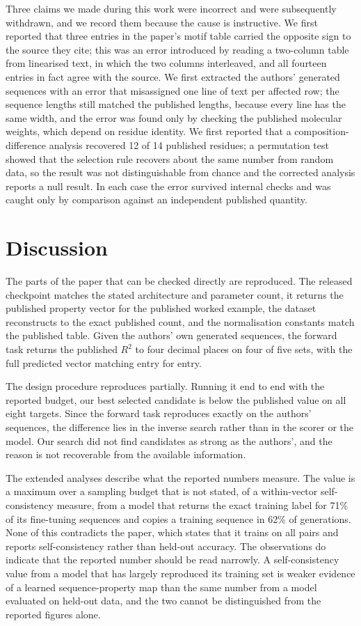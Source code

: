 \documentclass[11pt,a4paper]{article}
\begin{document}
Three claims we made during this work were incorrect and were subsequently
withdrawn, and we record them because the cause is instructive. We first reported
that three entries in the paper's motif table carried the opposite sign to the
source they cite; this was an error introduced by reading a two-column table
from linearised text, in which the two columns interleaved, and all fourteen
entries in fact agree with the source. We first extracted the authors' generated
sequences with an error that misassigned one line of text per affected row; the
sequence lengths still matched the published lengths, because every line has the
same width, and the error was found only by checking the published molecular
weights, which depend on residue identity. We first reported that a
composition-difference analysis recovered 12 of 14 published residues; a
permutation test showed that the selection rule recovers about the same number
from random data, so the result was not distinguishable from chance and the
corrected analysis reports a null result. In each case the error survived
internal checks and was caught only by comparison against an independent
published quantity.

\section{Discussion}

The parts of the paper that can be checked directly are reproduced. The released
checkpoint matches the stated architecture and parameter count, it returns the
published property vector for the published worked example, the dataset
reconstructs to the exact published count, and the normalisation constants match
the published table. Given the authors' own generated sequences, the forward
task returns the published $R^2$ to four decimal places on four of five sets,
with the full predicted vector matching entry for entry.

The design procedure reproduces partially. Running it end to end with the
reported budget, our best selected candidate is below the published value on all
eight targets. Since the forward task reproduces exactly on the authors'
sequences, the difference lies in the inverse search rather than in the scorer
or the model. Our search did not find candidates as strong as the authors',
and the reason is not recoverable from the available information.

The extended analyses describe what the reported numbers measure. The value is a
maximum over a sampling budget that is not stated, of a within-vector
self-consistency measure, from a model that returns the exact training label for
71\% of its fine-tuning sequences and copies a training sequence in 62\% of
generations. None of this contradicts the paper, which states that it trains on
all pairs and reports self-consistency rather than held-out accuracy. The
observations do indicate that the reported number should be read narrowly. A
self-consistency value from a model that has largely reproduced its training set
is weaker evidence of a learned sequence-property map than the same number from a
model evaluated on held-out data, and the two cannot be distinguished from the
reported figures alone.
\end{document}
